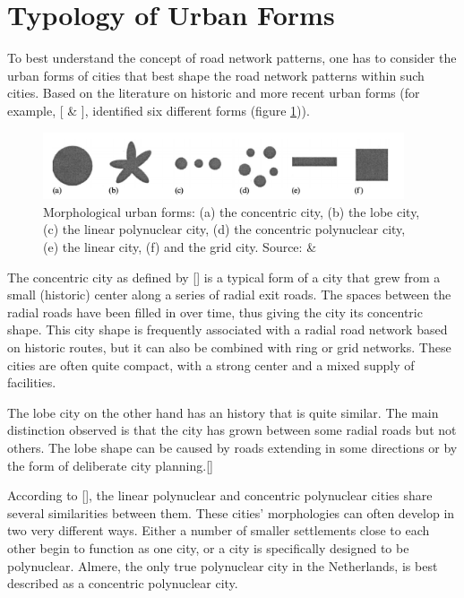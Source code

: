 
\section{Typology of Urban Forms}
To best understand the concept of road network patterns, one has to consider the urban forms of cities that best shape the road network patterns within such cities. Based on the literature on historic and more recent urban forms (for example, [\cite{deKlerk:1980} \& \cite{Rottier:1980}], identified six different forms (figure \ref{fig:urban forms})).
\begin{figure}[h]
\centering
\includegraphics[width=0.95\textwidth,center]{picture/figure1.png}
\caption[Morphological Urban Forms]{Morphological urban forms: (a) the concentric city, (b) the lobe city, (c) the linear polynuclear city, (d) the concentric polynuclear city, (e) the linear city, (f) and the grid city.  Source: \cite{deKlerk:1980} \& \cite{Rottier:1980}}
\label{fig:urban forms}
\end{figure}

The concentric city as defined by [\cite{Snellen:2002}] is a typical form of a city that grew from a small (historic) center along a series of radial exit roads. The spaces between the radial roads have been filled in over time, thus giving the city its concentric shape. This city shape is frequently associated with a radial road network based on historic routes, but it can also be combined with ring or grid networks. These cities are often quite compact, with a strong center and a mixed supply of facilities.

The lobe city on the other hand has an history that is quite similar. The main distinction observed is that the city has grown between some radial roads but not others. The lobe shape can be caused by roads extending in some directions or by the form of deliberate city planning.[\cite{Snellen:2002}]

According to [\cite{Snellen:2002}],  the linear polynuclear and concentric polynuclear cities share several similarities between them. These cities' morphologies can often develop in two very different ways. Either a number of smaller settlements close to each other begin to function as one city, or a city is specifically designed to be polynuclear. Almere, the only true polynuclear city in the Netherlands, is best described as a concentric polynuclear city.

